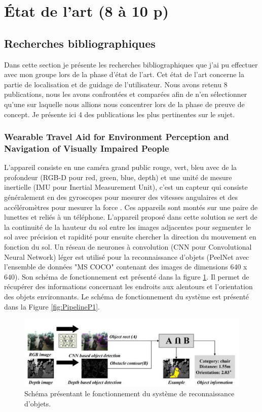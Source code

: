 \documentclass[11pt]{article}
\begin{document}
  \section{État de l'art (8 à 10 p)}  
  \subsection{Recherches bibliographiques}
  Dans cette section je présente les recherches bibliographiques que j'ai pu effectuer avec mon groupe lors de la phase d'état de l'art.
  Cet état de l'art concerne la partie de localisation et de guidage de l'utilisateur. Nous avons retenu 8 publications, nous les avons 
  confrontées et comparées afin de n'en sélectionner qu'une sur laquelle nous allions nous concentrer lors de la phase de preuve de 
  concept. Je présente ici 4 des publications les plus pertinentes sur le sujet.

  \subsubsection{Wearable Travel Aid for Environment Perception and Navigation of Visually Impaired People}

  L'appareil consiste en une caméra grand public rouge, vert, bleu avec de la profondeur (RGB-D pour red, green, blue, depth)
  et une unité de mesure inertielle (IMU pour Inertial Measurement Unit), c'est un capteur qui consiste généralement en des gyroscopes 
  pour mesurer des vitesses angulaires et des accéléromètres pour mesurer la force \cite{baiWearableTravelAid2019}. Ces appareils sont montés sur une paire de lunettes
  et reliés à un téléphone. L'appareil proposé dans cette solution se sert de la continuité de la hauteur du sol entre les images 
  adjacentes pour segmenter le sol avec précision et rapidité pour ensuite chercher la direction du mouvement en fonction du sol.
  Un réseau de neurones à convolution (CNN pour Convolutional Neural Network) léger est utilisé pour la reconnaissance d'objets 
  (PeelNet avec l'ensemble de données "MS COCO" contenant des images de dimensions 640 x 640). Son schéma de fonctionnement est présenté 
  dans la figure \ref{fig:ReconnaissanceP1}. Il permet de récupérer des informations concernant les endroits aux alentours et l'orientation 
  des objets environnants. Le schéma de fonctionnement du système est présenté dans la Figure \ref{fig:PipelineP1}.

  \begin{figure}[hbt]  
    \includegraphics[width=\textwidth]{RecognitionP1.png}    
    \caption{Schéma présentant le fonctionnement du système de reconnaissance d'objets.}
    \label{fig:ReconnaissanceP1}
  \end{figure} 
\end{document}

